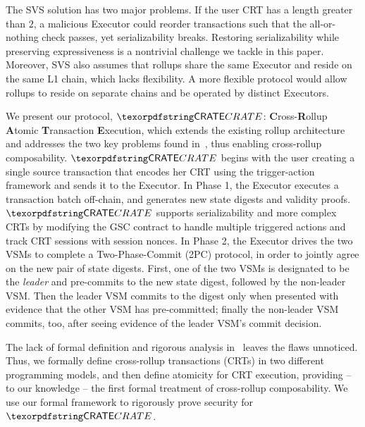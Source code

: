 The SVS solution has two major problems. If the user CRT has a length greater than $2$, a malicious Executor could reorder transactions such that the all-or-nothing check passes, yet serializability breaks. Restoring serializability while preserving expressiveness is a nontrivial challenge we tackle in this paper.
Moreover, SVS also assumes that rollups share the same Executor and reside on the same L1 chain, which lacks flexibility. A more flexible protocol would allow rollups to reside on separate chains and be operated by distinct Executors. 




We present our protocol, $\pname$: \textbf{C}ross-\textbf{R}ollup \textbf{A}tomic \textbf{T}ransaction \textbf{E}xecution, which extends the existing rollup architecture and addresses the two key problems found in~\cite{shared-val-seq-23}, thus enabling cross-rollup composability. 
$\pname$ begins with the user creating a single source transaction that encodes her CRT using the trigger-action framework and sends it to the Executor. In Phase 1, the Executor executes a transaction batch off-chain, and generates new state digests and validity proofs. $\pname$ supports serializability and more complex CRTs by modifying the GSC contract to handle multiple triggered actions and track CRT sessions with session nonces. In Phase 2, the Executor drives the two VSMs to complete a Two-Phase-Commit (2PC) protocol, in order to jointly agree on the new pair of state digests. First, one of the two VSMs is designated to be the \emph{leader} and pre-commits to the new state digest, followed by the non-leader VSM. Then the leader VSM commits to the digest only when presented with evidence that the other VSM has pre-committed; finally the non-leader VSM commits, too, after seeing evidence of the leader VSM's commit decision.

The lack of formal definition and rigorous analysis in~\cite{shared-val-seq-23} leaves the flaws unnoticed.
Thus, we formally define cross-rollup transactions (CRTs) in two different programming models, and then define atomicity for CRT execution, providing -- to our knowledge -- the first formal treatment of cross-rollup composability. We use our formal framework to rigorously prove security for $\pname$.

